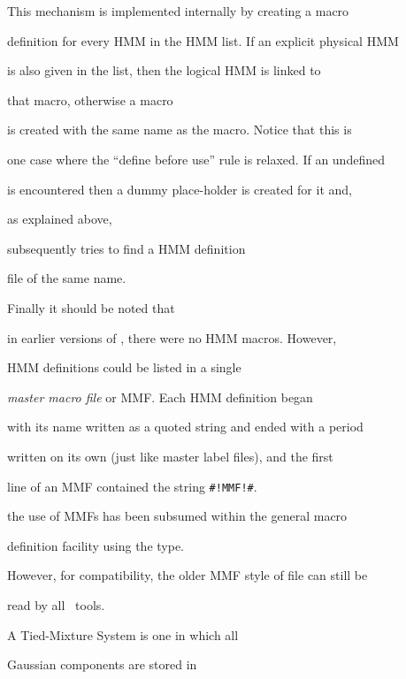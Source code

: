 This mechanism is implemented internally by creating a  macro


definition for every HMM in the HMM list.  If an explicit physical HMM


is also given in the list, then the logical HMM is linked to 


that macro, otherwise a  macro


is created with the same name as the  macro.  Notice that this is


one case where the ``define before use'' rule is relaxed.  If an undefined


 is encountered then a dummy place-holder is created for it and,


as explained above,


 subsequently tries to find a HMM definition 


file of the same name.





Finally it should be noted that 


in earlier versions of \HTK, there were no HMM macros.  However,


HMM definitions could be listed in a single 


\textit{master macro file} or MMF.  Each HMM definition began


with its name written as a quoted string and ended with a period


written on its own (just like master label files), and  the first


line of an MMF contained the string \texttt{\#!MMF!\#}.  \inthisversion


the use of MMFs has been subsumed within the general macro


definition facility using the  type.


However, for compatibility, the older MMF style of file can still be


read by all \HTK\ tools.










A Tied-Mixture System is one in which all 


Gaussian components are stored in


